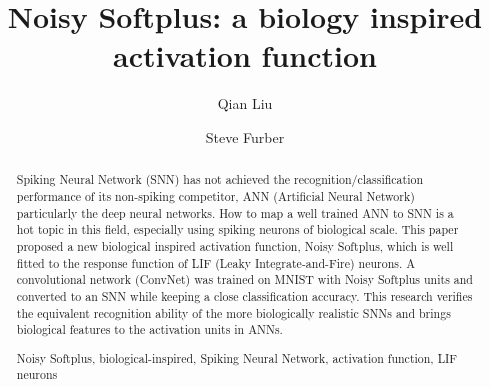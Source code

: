 \documentclass[runningheads,a4paper]{llncs}
\newcommand{\keywords}[1]{\par\addvspace\baselineskip
\noindent\keywordname\enspace\ignorespaces#1}
\begin{document}
\mainmatter  %

\title{Noisy Softplus: a biology inspired activation function}


%
%
\author{Qian Liu \and Steve Furber
}
%


%
%

\maketitle


\begin{abstract}
  Spiking Neural Network (SNN) has not achieved the recognition/classification performance of its non-spiking competitor, ANN (Artificial Neural Network) particularly the deep neural networks.
  How to map a well trained ANN to SNN is a hot topic in this field, especially using spiking neurons of biological scale.
  This paper proposed a new biological inspired activation function, Noisy Softplus, which is well fitted to the response function of LIF (Leaky Integrate-and-Fire) neurons.
  A convolutional network (ConvNet) was trained on MNIST with Noisy Softplus units and converted to an SNN while keeping a close classification accuracy.
  This research verifies the equivalent recognition ability of the more biologically realistic SNNs and brings biological features to the activation units in ANNs.
\keywords{Noisy Softplus, biological-inspired, Spiking Neural Network, activation function, LIF neurons}
\end{abstract}
\end{document}
